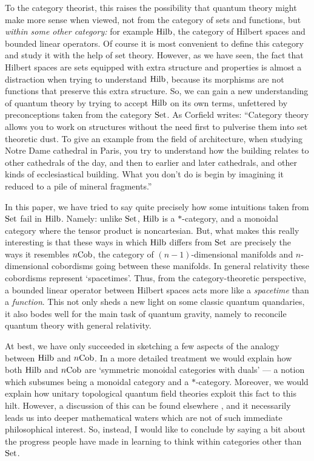 \documentclass{article}
\newcommand{\Set}{{\rm Set}}
\newcommand{\Hilb}{{\rm Hilb}}
\newcommand{\Cob}{{\rm Cob}}
\begin{document}
To the category theorist, this raises the possibility that
quantum theory might make more sense when viewed, not from
the category of sets and functions, but {\sl within some other category:} 
for example $\Hilb$, the category of Hilbert spaces and bounded 
linear operators.  Of course it is most convenient to define this 
category and study it with the help of set theory.  However, as we
have seen, the fact that Hilbert spaces are sets equipped with extra
structure and properties is almost a distraction when trying to 
understand $\Hilb$, because its morphisms are not functions that
preserve this extra structure.   So, we can gain a new understanding
of quantum theory by trying to accept $\Hilb$ on its own terms, 
unfettered by preconceptions taken from the category $\Set$.  As 
Corfield \cite{Corfield} writes: ``Category theory allows you to work 
on structures without the need first to pulverise them into set 
theoretic dust.  To give an example from the field of architecture, 
when studying Notre Dame cathedral in Paris, you try to understand how 
the building relates to other cathedrals of the day, and then to earlier 
and later cathedrals, and other kinds of ecclesiastical building.  
What you don't do is begin by imagining it reduced to a pile
of mineral fragments.''

In this paper, we have tried to say quite precisely how some intuitions 
taken from $\Set$ fail in $\Hilb$.   Namely: unlike $\Set$, $\Hilb$ 
is a $\ast$-category, and a monoidal category where the tensor product
is noncartesian.  But, what makes this really interesting is that these 
ways in which $\Hilb$ differs from $\Set$ are precisely the ways 
it resembles $n\Cob$, the category of $(n-1)$-dimensional 
manifolds and $n$-dimensional cobordisms going between these
manifolds.  In general relativity these cobordisms represent 
`spacetimes'.  Thus, from the category-theoretic perspective, a 
bounded linear operator between Hilbert spaces acts more like a 
{\it spacetime} than a {\it function}.  This not only sheds a new light 
on some classic quantum quandaries, it also bodes well for the main 
task of quantum gravity, namely to reconcile quantum theory with general
relativity.

At best, we have only succeeded in sketching a few aspects of the
analogy between $\Hilb$ and $n\Cob$.  In
a more detailed treatment we would explain how both $\Hilb$ and
$n\Cob$ are `symmetric monoidal categories with duals' --- a notion
which subsumes being a monoidal category and a $\ast$-category.
Moreover, we would explain how unitary topological quantum field
theories exploit this fact to this hilt.  However, a discussion of
this can be found elsewhere \cite{BD}, and it necessarily leads
us into deeper mathematical waters which are not of such immediate
philosophical interest.  So, instead, I would like to conclude by
saying a bit about the progress people have made in learning to
think within categories other than $\Set$.
\end{document}
